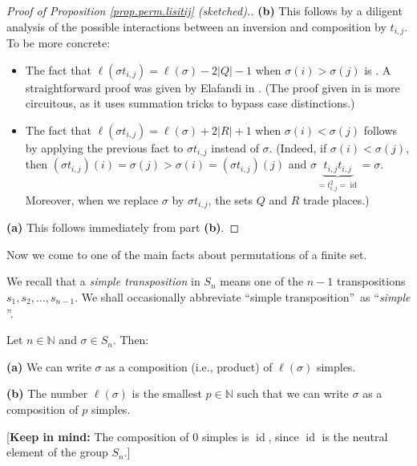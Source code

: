 \begin{proof}
[Proof of Proposition \ref{prop.perm.lisitij} (sketched).]\textbf{(b)} This
follows by a diligent analysis of the possible interactions between an
inversion and composition by $t_{i,j}$. To be more concrete:

\begin{itemize}
\item The fact that $\ell\left(  \sigma t_{i,j}\right)  =\ell\left(
\sigma\right)  -2\left\vert Q\right\vert -1$ when $\sigma\left(  i\right)
>\sigma\left(  j\right)  $ is \cite[Exercise 5.20]{detnotes}. A
straightforward proof was given by Elafandi in \cite[solution to Exercise
1]{18f-hw4se}. (The proof given in \cite[solution to Exercise 5.20]{detnotes}
is more circuitous, as it uses summation tricks to bypass case distinctions.)

\item The fact that $\ell\left(  \sigma t_{i,j}\right)  =\ell\left(
\sigma\right)  +2\left\vert R\right\vert +1$ when $\sigma\left(  i\right)
<\sigma\left(  j\right)  $ follows by applying the previous fact to $\sigma
t_{i,j}$ instead of $\sigma$. (Indeed, if $\sigma\left(  i\right)
<\sigma\left(  j\right)  $, then $\left(  \sigma t_{i,j}\right)  \left(
i\right)  =\sigma\left(  j\right)  >\sigma\left(  i\right)  =\left(  \sigma
t_{i,j}\right)  \left(  j\right)  $ and $\sigma\underbrace{t_{i,j}t_{i,j}%
}_{=t_{i,j}^{2}=\operatorname*{id}}=\sigma$. Moreover, when we replace
$\sigma$ by $\sigma t_{i,j}$, the sets $Q$ and $R$ trade places.)
\end{itemize}

\textbf{(a)} This follows immediately from part \textbf{(b)}.
\end{proof}

Now we come to one of the main facts about permutations of a finite set.

\begin{convention}
\label{conv.perm.simple}We recall that a \emph{simple transposition} in
$S_{n}$ means one of the $n-1$ transpositions $s_{1},s_{2},\ldots,s_{n-1}$. We
shall occasionally abbreviate \textquotedblleft simple
transposition\textquotedblright\ as \textquotedblleft\emph{simple}%
\textquotedblright.
\end{convention}

\begin{theorem}
%
\label{thm.perm.len.redword1}Let $n\in\mathbb{N}$ and $\sigma\in S_{n}$. Then:
\medskip

\textbf{(a)} We can write $\sigma$ as a composition (i.e., product) of
$\ell\left(  \sigma\right)  $ simples. \medskip

\textbf{(b)} The number $\ell\left(  \sigma\right)  $ is the smallest
$p\in\mathbb{N}$ such that we can write $\sigma$ as a composition of $p$
simples. \medskip

[\textbf{Keep in mind:} The composition of $0$ simples is $\operatorname*{id}%
$, since $\operatorname*{id}$ is the neutral element of the group $S_{n}$.]
\end{theorem}

